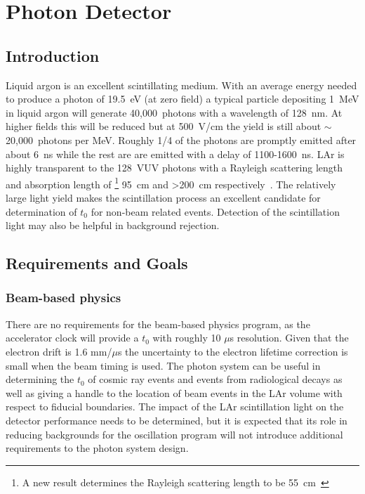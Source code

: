 \chapter{Photon Detector}
\label{ch:photon}
\section{Introduction}

Liquid argon is an excellent scintillating medium. With an average
energy needed to produce a photon of 19.5~eV (at zero field) a typical
particle depositing 1~MeV in liquid argon will generate 40,000~photons
with a wavelength of 128~nm. At higher fields this will be reduced but
at 500~V/cm the yield is still about $\sim$20,000~photons per
MeV. Roughly 1/4 of the photons are promptly emitted after about 6~ns
while the rest are are emitted with a delay of 1100-1600~ns. LAr is
highly transparent to the 128~VUV photons with a Rayleigh scattering
length and absorption length of \footnote{A new result determines the
  Rayleigh scattering length to be 55~cm~\cite{RAYLEIGH_NEW}} 95~cm
and >200~cm respectively~\cite{bib:gracearxiv}. The relatively large
light yield makes the scintillation process an excellent candidate for
determination of $t_{0}$ for non-beam related events. Detection of the
scintillation light may also be helpful in background rejection.

\section{Requirements and Goals}

\subsection{Beam-based physics}

There are no requirements for the beam-based physics program, as the
accelerator clock will provide a $t_{0}$ with roughly 10 $\mu$s
resolution. Given that the electron drift is 1.6 mm/$\mu$s the
uncertainty to the electron lifetime correction is small when the beam
timing is used. The photon system can be useful in determining the
$t_{0}$ of cosmic ray events and events from radiological decays as
well as giving a handle to the location of beam events in the LAr
volume with respect to fiducial boundaries. The impact of the LAr
scintillation light on the detector performance needs to be
determined, but it is expected that its role in reducing backgrounds
for the oscillation program will not introduce additional requirements
to the photon system design.

